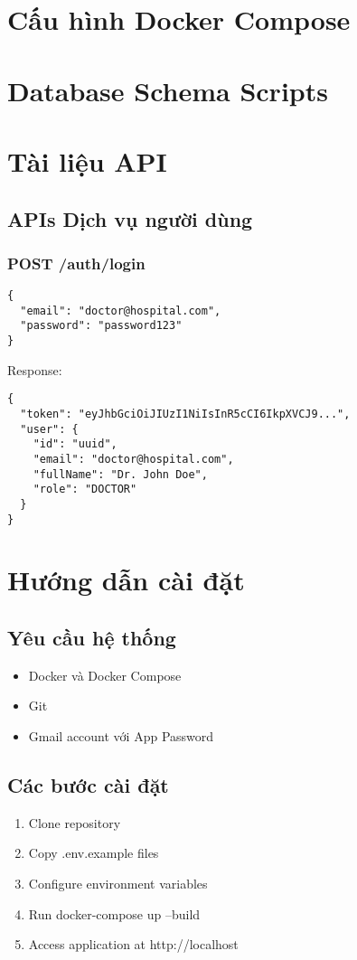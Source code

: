 \documentclass[12pt,a4paper]{report}
\begin{document}
\appendix

\chapter{Cấu hình Docker Compose}

\chapter{Database Schema Scripts}

\chapter{Tài liệu API}
\section{APIs Dịch vụ người dùng}
\subsection{POST /auth/login}
\begin{lstlisting}[language=text]
{
  "email": "doctor@hospital.com",
  "password": "password123"
}
\end{lstlisting}

Response:
\begin{lstlisting}[language=text]
{
  "token": "eyJhbGciOiJIUzI1NiIsInR5cCI6IkpXVCJ9...",
  "user": {
    "id": "uuid",
    "email": "doctor@hospital.com",
    "fullName": "Dr. John Doe",
    "role": "DOCTOR"
  }
}
\end{lstlisting}

\chapter{Hướng dẫn cài đặt}
\section{Yêu cầu hệ thống}
\begin{itemize}
    \item Docker và Docker Compose
    \item Git
    \item Gmail account với App Password
\end{itemize}

\section{Các bước cài đặt}
\begin{enumerate}
    \item Clone repository
    \item Copy .env.example files
    \item Configure environment variables
    \item Run docker-compose up --build
    \item Access application at http://localhost
\end{enumerate}
\end{document}
